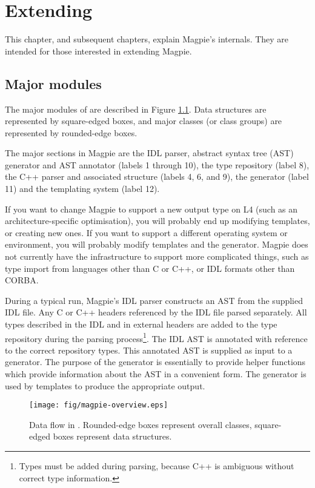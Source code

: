 \chapter{Extending \magpie}

This chapter, and subsequent chapters, explain Magpie's internals. They are intended for those interested in extending Magpie.

\section{Major modules}

The major modules of \magpie are described in Figure \ref{fig:magpie:dataflow}. Data structures are represented by square-edged boxes, and major classes (or class groups) are represented by rounded-edge boxes.

The major sections in Magpie are the IDL parser, abstract syntax tree (AST) generator and AST annotator (labels 1 through 10), the type repository (label 8), the C++ parser and associated structure (labels 4, 6, and 9), the generator (label 11) and the templating system (label 12). 

If you want to change Magpie to support a new output type on L4 (such as an architecture-specific optimisation), you will probably end up modifying templates, or creating new ones. If you want to support a different operating system or environment, you will probably modify templates and the generator. Magpie does not currently have the infrastructure to support more complicated things, such as type import from languages other than C or C++, or IDL formats other than CORBA.

During a typical run, Magpie's IDL parser constructs an AST from the supplied IDL file. Any C or C++ headers referenced by the IDL file parsed separately. All types described in the IDL and in external headers are added to the type repository during the parsing process\footnote{Types must be added during parsing, because C++ is ambiguous without correct type information.}. The IDL AST is annotated with reference to the correct repository types. This annotated AST is supplied as input to a generator. The purpose of the generator is essentially to provide helper functions which provide information about the AST in a convenient form. The generator is used by templates to produce the appropriate output.

\begin{figure}
\texttt{[image: fig/magpie-overview.eps]}
\caption{Data flow in \magpie. Rounded-edge boxes represent overall classes, square-edged boxes represent data structures.}
\label{fig:magpie:dataflow}
\end{figure}

